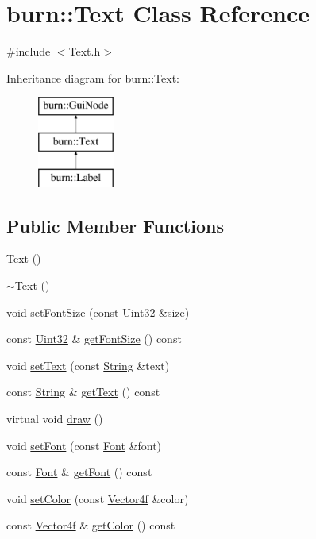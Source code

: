 \hypertarget{classburn_1_1_text}{\section{burn\-:\-:Text Class Reference}
\label{classburn_1_1_text}
}


{\ttfamily \#include $<$Text.\-h$>$}

Inheritance diagram for burn\-:\-:Text\-:\begin{figure}[H]
\begin{center}
\leavevmode
\includegraphics[height=3.000000cm]{classburn_1_1_text}
\end{center}
\end{figure}
\subsection*{Public Member Functions}
\begin{DoxyCompactItemize}
\item 
\hyperlink{classburn_1_1_text_a850dfb9cc65cd95e4eb122e586afd60d}{Text} ()
\item 
\hyperlink{classburn_1_1_text_a338a512826f16d195b37497b14ee8c9d}{$\sim$\-Text} ()
\item 
void \hyperlink{classburn_1_1_text_a414c643bde94ee0b6d339cc05470a7ba}{set\-Font\-Size} (const \hyperlink{namespaceburn_ab40b09022209bd449d317c1f0e95356b}{Uint32} \&size)
\item 
const \hyperlink{namespaceburn_ab40b09022209bd449d317c1f0e95356b}{Uint32} \& \hyperlink{classburn_1_1_text_afee8bfc930dd7f813404417f19ee2bc1}{get\-Font\-Size} () const 
\item 
void \hyperlink{classburn_1_1_text_a0b9e68d8c6e65280cccbc0372b390e7c}{set\-Text} (const \hyperlink{classburn_1_1_string}{String} \&text)
\item 
const \hyperlink{classburn_1_1_string}{String} \& \hyperlink{classburn_1_1_text_aa0892c4d1c006839d48d755b8a2951bf}{get\-Text} () const 
\item 
virtual void \hyperlink{classburn_1_1_text_aa451ad17d21dc9c12cef712aa41914bf}{draw} ()
\item 
void \hyperlink{classburn_1_1_text_ab69a87d3df7f792c48c9b13098f14b9f}{set\-Font} (const \hyperlink{classburn_1_1_font}{Font} \&font)
\item 
const \hyperlink{classburn_1_1_font}{Font} \& \hyperlink{classburn_1_1_text_a26799e9b7eacd0de8cf8f26dd6e8117a}{get\-Font} () const 
\item 
void \hyperlink{classburn_1_1_text_a1319c5bf34b0f26c7a1d341e949c5a9d}{set\-Color} (const \hyperlink{namespaceburn_a58a411b9d83c7970518a9250c1c78068}{Vector4f} \&color)
\item 
const \hyperlink{namespaceburn_a58a411b9d83c7970518a9250c1c78068}{Vector4f} \& \hyperlink{classburn_1_1_text_af5eb3305970021ae9cad3a3ca13e6e84}{get\-Color} () const 
\end{DoxyCompactItemize}

